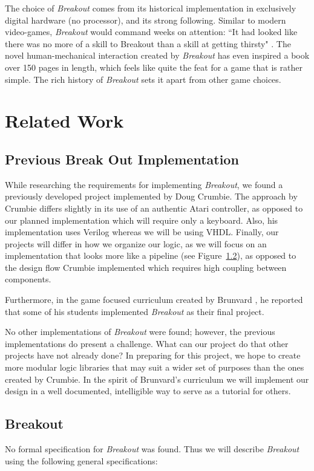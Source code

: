 \documentclass[conference]{IEEEtran}
\begin{document}
The choice of \emph{Breakout} comes from its historical implementation in exclusively digital hardware (no processor)\cite{Goldberg:2009}, and its strong following. Similar to modern video-games, \emph{Breakout} would command weeks on attention: ``It had looked like there was no more of a skill to Breakout than a skill at getting thirsty" \cite{david:1984}. The novel human-mechanical interaction created by \emph{Breakout} has even inspired a book over 150 pages in length, which feels like quite the feat for a game that is rather simple. The rich history of \emph{Breakout} sets it apart from other game choices.

\section{Related Work}

\subsection{Previous Break Out Implementation}
While researching the requirements for implementing \emph{Breakout}, we found a previously developed project implemented by Doug Crumbie\cite{Cumbie:2008}. The approach by Crumbie differs slightly in its use of an authentic Atari controller, as opposed to our planned implementation which will require only a keyboard. Also, his implementation uses Verilog whereas we will be using VHDL. Finally, our projects will differ in how we organize our logic, as we will focus on an implementation that looks more like a pipeline (see Figure~\ref{}), as opposed to the design flow Crumbie implemented which requires high coupling between components.

Furthermore, in the game focused curriculum created by Brunvard \cite{Brunvand:2011}, he reported that some of his students implemented \emph{Breakout} as their final project.

No other implementations of \emph{Breakout} were found; however, the previous implementations do present a challenge. What can our project do that other projects have not already done? In preparing for this project, we hope to create more modular logic libraries that may suit a wider set of purposes than the ones created by Crumbie\cite{Cumbie:2008}. In the spirit of Brunvard's curriculum \cite{Brunvand:2011} we will implement our design in a well documented, intelligible way to serve as a tutorial for others.

\subsection{Breakout}
No formal specification for \emph{Breakout} was found. Thus we will describe \emph{Breakout} using the following general specifications:
\end{document}
